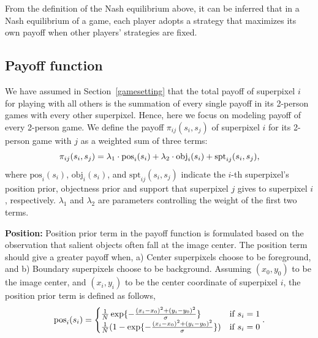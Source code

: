 \documentclass[journal]{IEEEtran}
\begin{document}
From the definition of the Nash equilibrium above, it can be inferred that in a Nash equilibrium of a game, each player adopts a strategy that maximizes its own payoff when other players' strategies are fixed.

\subsection{Payoff function}
We have assumed in Section~\ref{gamesetting} that the total payoff of superpixel $i$ for playing with all others is the summation of every single payoff in its 2-person games with every other superpixel. Hence, here we focus on modeling payoff of every 2-person game. We define the payoff $\pi_{ij}(s_i, s_j)$ of superpixel $i$ for its 2-person game with $j$ as a weighted sum of three terms:
\begin{equation}
\setlength{\abovedisplayskip}{2pt}
\setlength{\belowdisplayskip}{2pt}
\label{payoff}
\pi_{ij}(s_i, s_j) = \lambda_1 \cdot \mbox{pos}_i(s_i) + \lambda_2 \cdot \mbox{obj}_i(s_i) + \mbox{spt}_{ij}(s_i, s_j), 
\end{equation}
where $\mbox{pos}_i(s_i)$, $\mbox{obj}_i(s_i)$, and $\mbox{spt}_{ij}(s_i, s_j)$ indicate the $i$-th superpixel's position prior, objectness prior and support that superpixel $j$ gives to superpixel $i$, respectively.
$\lambda_1$ and $\lambda_2$ %
are parameters controlling the weight of the first two terms. 

\noindent \textbf{Position:} Position prior term in the payoff function is formulated based on the observation that salient objects often fall at the image center. The position term should give a greater payoff when, a) Center superpixels choose to be foreground,
and b) Boundary superpixels choose to be background. Assuming $(x_0, y_0)$ to be the image center, and $(x_i, y_i)$ to be the center coordinate of superpixel $i$, the position prior term is defined as follows,
\begin{equation}
\setlength{\abovedisplayskip}{2pt}
\setlength{\belowdisplayskip}{2pt}
\label{pos}
\mbox{pos}_i(s_i) =
\begin{cases}
\frac{1}{N} \exp\{-\frac{(x_i - x_0)^2 + (y_i - y_0)^2}{\sigma}\} & \mbox{if}~s_i = 1 \\
\frac{1}{N} (1 - \exp\{-\frac{(x_i - x_0)^2 + (y_i - y_0)^2}{\sigma}\}) &\mbox{if}~s_i = 0
\end{cases}. 
\end{equation}
\end{document}
